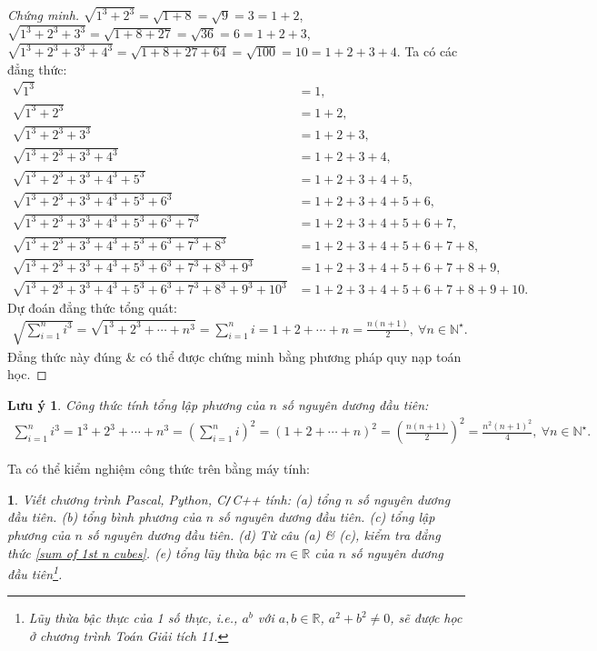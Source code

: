 \documentclass{article}
\newtheorem{baitoan}{}
\newtheorem{luuy}{Lưu ý}
\begin{document}
\begin{proof}[Chứng minh]
	$\sqrt{1^3 + 2^3} = \sqrt{1 + 8} = \sqrt{9} = 3 = 1 + 2$, $\sqrt{1^3 + 2^3 + 3^3} = \sqrt{1 + 8 + 27} = \sqrt{36} = 6 = 1 + 2 + 3$, $\sqrt{1^3 + 2^3 + 3^3 + 4^3} = \sqrt{1 + 8 + 27 + 64} = \sqrt{100} = 10 = 1 + 2 + 3 + 4$. Ta có các đẳng thức:
	\begin{align*}
		\sqrt{1^3} &= 1,\\
		\sqrt{1^3 + 2^3} &= 1 + 2,\\
		\sqrt{1^3 + 2^3 + 3^3} &= 1 + 2 + 3,\\
		\sqrt{1^3 + 2^3 + 3^3 + 4^3} &= 1 + 2 + 3 + 4,\\
		\sqrt{1^3 + 2^3 + 3^3 + 4^3 + 5^3} &= 1 + 2 + 3 + 4 + 5,\\
		\sqrt{1^3 + 2^3 + 3^3 + 4^3 + 5^3 + 6^3} &= 1 + 2 + 3 + 4 + 5 + 6,\\
		\sqrt{1^3 + 2^3 + 3^3 + 4^3 + 5^3 + 6^3 + 7^3} &= 1 + 2 + 3 + 4 + 5 + 6 + 7,\\
		\sqrt{1^3 + 2^3 + 3^3 + 4^3 + 5^3 + 6^3 + 7^3 + 8^3} &= 1 + 2 + 3 + 4 + 5 + 6 + 7 + 8,\\
		\sqrt{1^3 + 2^3 + 3^3 + 4^3 + 5^3 + 6^3 + 7^3 + 8^3 + 9^3} &= 1 + 2 + 3 + 4 + 5 + 6 + 7 + 8 + 9,\\
		\sqrt{1^3 + 2^3 + 3^3 + 4^3 + 5^3 + 6^3 + 7^3 + 8^3 + 9^3 + 10^3} &= 1 + 2 + 3 + 4 + 5 + 6 + 7 + 8 + 9 + 10.
	\end{align*}
	Dự đoán đẳng thức tổng quát:
	\begin{align*}
		\sqrt{\sum_{i=1}^n i^3} = \sqrt{1^3 + 2^3 + \cdots + n^3} = \sum_{i=1}^n i = 1 + 2 + \cdots + n = \frac{n(n + 1)}{2},\ \forall n\in\mathbb{N}^\star.
	\end{align*}
	Đẳng thức này đúng \& có thể được chứng minh bằng phương pháp quy nạp toán học.
\end{proof}

\begin{luuy}
	Công thức tính tổng lập phương của $n$ số nguyên dương đầu tiên:
	\begin{align}
		\label{sum of 1st n cubes}
		\sum_{i=1}^n i^3 = 1^3 + 2^3 + \cdots + n^3 = \left(\sum_{i=1}^n i\right)^2 = (1 + 2 + \cdots + n)^2 = \left(\frac{n(n + 1)}{2}\right)^2 = \frac{n^2(n + 1)^2}{4},\ \forall n\in\mathbb{N}^\star.
	\end{align}
\end{luuy}
Ta có thể kiểm nghiệm công thức trên bằng máy tính:

\begin{baitoan}
	Viết chương trình {\sf Pascal, Python, C\texttt{/}C++} tính: (a) tổng $n$ số nguyên dương đầu tiên. (b) tổng bình phương của $n$ số nguyên dương đầu tiên. (c) tổng lập phương của $n$ số nguyên dương đầu tiên. (d) Từ câu (a) \& (c), kiểm tra đẳng thức \eqref{sum of 1st n cubes}. (e) tổng lũy thừa bậc $m\in\mathbb{R}$ của $n$ số nguyên dương đầu tiên\footnote{Lũy thừa bậc thực của 1 số thực, i.e., $a^b$ với $a,b\in\mathbb{R}$, $a^2 + b^2\ne0$, sẽ được học ở chương trình Toán Giải tích 11.}.
\end{baitoan}
\end{document}
